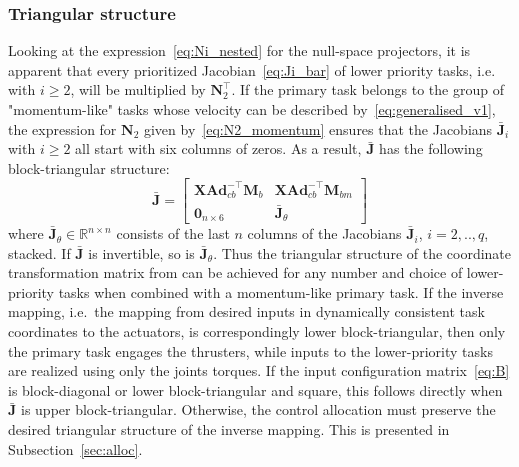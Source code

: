 \documentclass[../main.tex]{subfiles}
\begin{document}
\subsubsection{Triangular structure}
Looking at the expression~\eqref{eq:Ni_nested} for the null-space projectors, it is apparent that every prioritized Jacobian~\eqref{eq:Ji_bar} of lower priority tasks, i.e. with $i \geq 2$, will be multiplied by $\bm{N}_2^\top$. If the primary task belongs to the group of "momentum-like" tasks whose velocity can be described by~\eqref{eq:generalised_v1}, the expression for $\bm{N}_2$ given by~\eqref{eq:N2_momentum} ensures that the Jacobians $\bar{\bm{J}}_i$ with $i \geq 2$ all start with six columns of zeros. As a result, $\bar{\bm{J}}$ has the following block-triangular structure:
\begin{equation}\label{eq:Jbar_triang}
    \bar{\bm{J}} = \begin{bmatrix}
        \bm{X} \bm{Ad}_{cb}^{-\top} \bm{M}_b & \bm{X} \bm{Ad}_{cb}^{-\top} \bm{M}_{bm} \\ \bm{0}_{n \times 6} & \bar{\bm{J}}_\theta
    \end{bmatrix}
\end{equation}
where $\bar{\bm{J}}_\theta \in \mathbb{R}^{n \times n}$ consists of the last $n$ columns of the Jacobians $\bar{\bm{J}}_i$, $i=2,..,q$, stacked. If $\bm{\bar{J}}$ is invertible, so is $\bar{\bm{J}}_\theta$. 
Thus the triangular structure of the coordinate transformation matrix from \cite{Giordano2018} can be achieved for any number and choice of lower-priority tasks when combined with a momentum-like primary task. %
If the inverse mapping, i.e.~the mapping from desired inputs in dynamically consistent task coordinates to the actuators, is correspondingly lower block-triangular, then only the primary task engages the thrusters, while inputs to the lower-priority tasks are realized using only the joints torques. If the input configuration matrix~\eqref{eq:B} is block-diagonal or lower block-triangular and square, this follows directly when $\bar{\bm{J}}$ is upper block-triangular. Otherwise, the control allocation must preserve the desired triangular structure of the inverse mapping. This is presented in Subsection~\ref{sec:alloc}.


\end{document}
